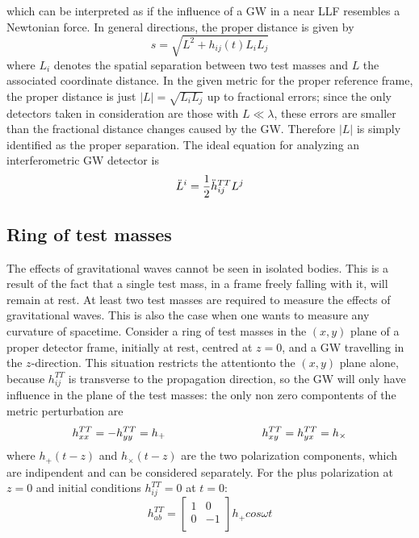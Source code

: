 \documentclass[binding=0.6cm, LaM]{sapthesis}
\begin{document}
which can be interpreted as if the influence of a GW in a near LLF resembles a Newtonian force.
In general directions, the proper distance is given by
\begin{equation}
s = \sqrt{L^2 + h_{ij}(t)L_{i}L_{j}}
\end{equation}
where $L_i$ denotes the spatial separation between two test masses and $L$ the associated coordinate distance.
In the given metric for the proper reference frame, the proper distance is just $|L| = \sqrt{L_iL_j}$ up to fractional errors; since the only detectors taken in consideration are those 
with $L \ll \lambda$, these errors are smaller than the fractional distance changes caused by the GW. 
Therefore $|L|$ is simply identified as the proper separation. The ideal equation for analyzing an interferometric GW detector is
\begin{equation}
{\ddot L}^i = {1 \over 2}{\ddot h}_{ij}^{TT}L^j
\end{equation}



 
\subsection{Ring of test masses}

The effects of gravitational waves cannot be seen in isolated bodies. This is a result of
the fact that a single test mass, in a frame freely falling with it, will remain at rest. At
least two test masses are required to measure the effects of gravitational waves. This is also
the case when one wants to measure any curvature of spacetime. 
Consider a ring of test masses in the $(x, y)$ plane of a proper detector frame, initially at rest, centred at $z = 0$, and a GW travelling in the $z$-direction. 
This situation restricts the attentionto the $(x,y)$ plane alone, because $h_{ij}^{TT}$ is transverse to the propagation direction, so the GW will only have influence in the plane of the test masses:
 the only non zero compontents of the metric perturbation are
\begin{equation}
h_{xx}^{TT} = - h_{yy}^{TT} = h_{+} \hspace*{3cm} h_{xy}^{TT} = h_{yx}^{TT} = h_{\times}
\end{equation}
where $h_{+}(t-z)$ and $h_{\times}(t-z)$ are the two polarization components, which are indipendent and can be considered separately.
For the plus polarization at $z=0$ and initial conditions $h_{ij}^{TT} = 0$ at $t=0$:
\begin{equation}
h_{ab}^{TT} = 
\begin{bmatrix}
1  & 0 \\
0 &  -1 \\
\end{bmatrix} 
h_{+}cos \omega t
\end{equation}
\end{document}
